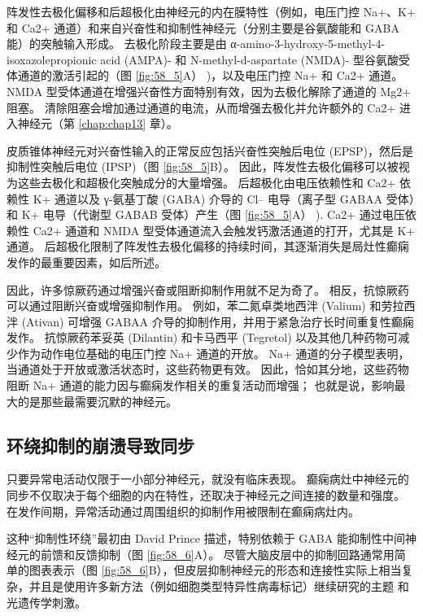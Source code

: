 阵发性去极化偏移和后超极化由神经元的内在膜特性（例如，电压门控 Na+、K+ 和 Ca2+ 通道）和来自兴奋性和抑制性神经元（分别主要是谷氨酸能和 GABA 能）的突触输入形成。 去极化阶段主要是由 α-amino-3-hydroxy-5-methyl-4-isoxazolepropionic acid (AMPA)- 和 N-methyl-d-aspartate (NMDA)- 型谷氨酸受体通道的激活引起的（图 \ref{fig:58_5}A） )，以及电压门控 Na+ 和 Ca2+ 通道。 NMDA 型受体通道在增强兴奋性方面特别有效，因为去极化解除了通道的 Mg2+ 阻塞。 清除阻塞会增加通过通道的电流，从而增强去极化并允许额外的 Ca2+ 进入神经元（第 \ref{chap:chap13} 章）。

皮质锥体神经元对兴奋性输入的正常反应包括兴奋性突触后电位 (EPSP)，然后是抑制性突触后电位 (IPSP)（图 \ref{fig:58_5}B）。 因此，阵发性去极化偏移可以被视为这些去极化和超极化突触成分的大量增强。 后超极化由电压依赖性和 Ca2+ 依赖性 K+ 通道以及 γ-氨基丁酸 (GABA) 介导的 Cl– 电导（离子型 GABAA 受体）和 K+ 电导（代谢型 GABAB 受体）产生（图 \ref{fig:58_5}A） ). Ca2+ 通过电压依赖性 Ca2+ 通道和 NMDA 型受体通道流入会触发钙激活通道的打开，尤其是 K+ 通道。 后超极化限制了阵发性去极化偏移的持续时间，其逐渐消失是局灶性癫痫发作的最重要因素，如后所述。

因此，许多惊厥药通过增强兴奋或阻断抑制作用就不足为奇了。 相反，抗惊厥药可以通过阻断兴奋或增强抑制作用。 例如，苯二氮卓类地西泮 (Valium) 和劳拉西泮 (Ativan) 可增强 GABAA 介导的抑制作用，并用于紧急治疗长时间重复性癫痫发作。 抗惊厥药苯妥英 (Dilantin) 和卡马西平 (Tegretol) 以及其他几种药物可减少作为动作电位基础的电压门控 Na+ 通道的开放。 Na+ 通道的分子模型表明，当通道处于开放或激活状态时，这些药物更有效。 因此，恰如其分地，这些药物阻断 Na+ 通道的能力因与癫痫发作相关的重复活动而增强； 也就是说，影响最大的是那些最需要沉默的神经元。

\subsection{环绕抑制的崩溃导致同步}
只要异常电活动仅限于一小部分神经元，就没有临床表现。 癫痫病灶中神经元的同步不仅取决于每个细胞的内在特性，还取决于神经元之间连接的数量和强度。 在发作间期，异常活动通过周围组织的抑制作用被限制在癫痫病灶内。

这种“抑制性环绕”最初由 David Prince 描述，特别依赖于 GABA 能抑制性中间神经元的前馈和反馈抑制（图 \ref{fig:58_6}A）。 尽管大脑皮层中的抑制回路通常用简单的图表表示（图 \ref{fig:58_6}B），但皮层抑制神经元的形态和连接性实际上相当复杂，并且是使用许多新方法（例如细胞类型特异性病毒标记）继续研究的主题 和光遗传学刺激。

